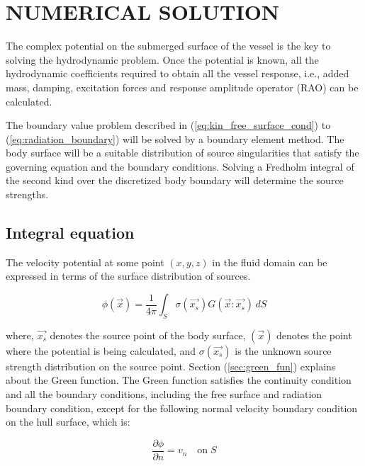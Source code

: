 \chapter{NUMERICAL SOLUTION}
The complex potential on the submerged surface of the vessel is the key to solving the hydrodynamic problem. 
Once the potential is known, all the hydrodynamic coefficients required 
to obtain all the vessel response, i.e., added mass, damping, excitation forces and 
response amplitude operator (RAO) can be calculated.

The boundary value problem described in (\ref{eq:kin_free_surface_cond}) to 
(\ref{eq:radiation_boundary})  will be solved by a boundary element method. 
The body surface will be a suitable distribution of source singularities that satisfy 
the governing equation and the boundary conditions. Solving a Fredholm integral of the 
second kind over the discretized body boundary will determine the source strengths. 

\section{Integral equation}
The velocity potential at some point $(x, y, z)$ in the fluid domain can be expressed in 
terms of the surface distribution of sources.

\begin{equation}
    \label{eq:vel_pot}
    \phi(\vec{x}) = \frac{1}{4\pi}\int_S \sigma(\vec{x_s})G(\vec{x}:\vec{x_s})\,dS
\end{equation}

where, $\vec{x_s}$ denotes the source point of the body surface, $(\vec{x})$ denotes the 
point where the potential is being calculated, and $\sigma(\vec{x_s})$ is the unknown 
source strength distribution on the source point. Section (\ref{sec:green_fun})
explains about the Green function. 
The Green function satisfies the continuity condition and all the boundary conditions, 
including the free surface and radiation boundary condition, except for the following 
normal velocity boundary condition on the hull surface, which is:

\begin{equation}
    \label{eq:vel_boundary_cond}
    \frac{\partial \phi}{\partial n} = v_n \quad \text{on}\; S
\end{equation}

